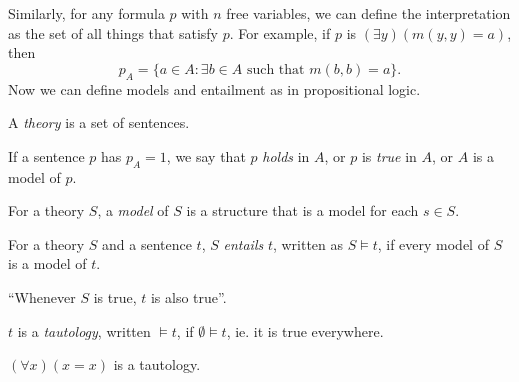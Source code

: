 \documentclass[a4paper]{article}
\begin{document}
\note Similarly, for any formula $p$ with $n$ free variables, we can define the interpretation as the set of all things that satisfy $p$. For example, if $p$ is $(\exists y)(m(y, y) = a)$, then 
\[
  p_A = \{a\in A: \exists b\in A\text{ such that } m(b, b) = a\}.
\]
Now we can define models and entailment as in propositional logic.
\begin{defi}[Theory]
  A \emph{theory} is a set of sentences.
\end{defi}

\begin{defi}[Model]
  If a sentence $p$ has $p_A = 1$, we say that $p$ \emph{holds} in $A$, or $p$ is \emph{true} in $A$, or $A$ is a model of $p$.

  For a theory $S$, a \emph{model} of $S$ is a structure that is a model for each $s\in S$.
\end{defi}

\begin{defi}
  For a theory $S$ and a sentence $t$, $S$ \emph{entails} $t$, written as $S\models t$, if every model of $S$ is a model of $t$.

  ``Whenever $S$ is true, $t$ is also true''.
\end{defi}

\begin{defi}[Tautology]
  $t$ is a \emph{tautology}, written $\models t$, if $\emptyset\models t$, ie. it is true everywhere.
\end{defi}

\begin{eg}
  $(\forall x)(x = x)$ is a tautology.
\end{eg}
\end{document}
